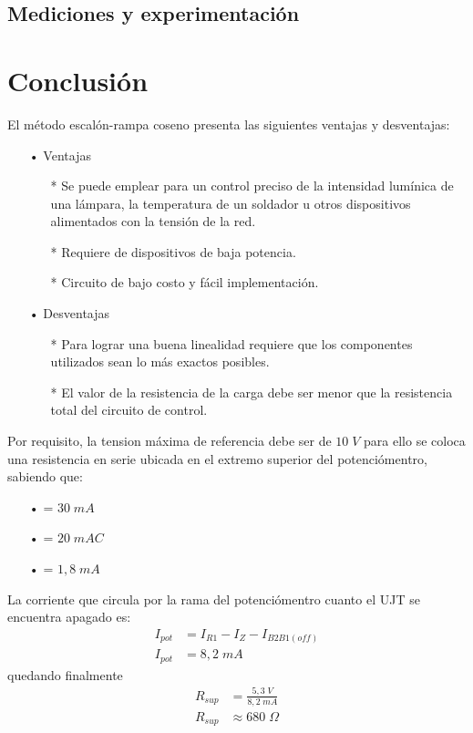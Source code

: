 \documentclass{article}
\begin{document}
\subsection{Mediciones y experimentación}

\section{Conclusión}
El método escalón-rampa coseno presenta las siguientes ventajas y desventajas:

\begin{itemize}
\item[•] Ventajas
	\begin{itemize}
		\item[*] Se puede emplear para un control preciso de la intensidad lumínica de una lámpara, la temperatura de un soldador u otros dispositivos alimentados con la tensión de la red.
		\item[*] Requiere de dispositivos de baja potencia.
		\item[*] Circuito de bajo costo y fácil implementación.
	\end{itemize}
\item[•] Desventajas
	\begin{itemize}
		\item[*] Para lograr una buena linealidad requiere que los componentes utilizados sean lo más exactos posibles.
		\item[*] El valor de la resistencia de la carga debe ser menor que la resistencia total del circuito de control.
	\end{itemize}
\end{itemize}

Por requisito, la tension máxima de referencia debe ser de $10 \; V$ para ello se coloca una resistencia en serie ubicada en el extremo superior del potenciómentro, sabiendo que:
\begin{itemize}\itemsep0em \itemindent=2em
	\item[•]{= $30 \; mA$}
	\item[•]{= $20 \; mAC$}
	\item[•]{= $1,8 \;  mA$}
\end{itemize}

La corriente que circula por la rama del potenciómentro cuanto el UJT se encuentra apagado es:
\begin{align*}
I_{pot} &= I_{R1} - I_Z - I_{B2B1(off)} \\
I_{pot} &= 8,2 \; mA
\end{align*}
quedando finalmente
\begin{align*}
R_{sup} &= \frac{5,3 \; V}{8,2 \; mA} \\
R_{sup} &\approx 680 \; \Omega
\end{align*}
\end{document}
